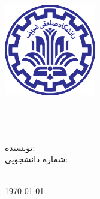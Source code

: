\begin{titlepage}

\center %



\includegraphics[width=0.3\textwidth]{title/logo.png}\\[1cm] 
\vspace{1cm}
\ifdefined\school
\Large \textsc{\school} \\[1.5cm] %
\ifdefined\department
\large \department\\[1.5cm] %
\fi

\makeatletter
\textsc{{ \huge \bfseries \thesistitle}}\\[1.5cm] %
 


\ifdefined\authorid
نویسنده:
\authorname\\ %
شماره دانشجویی:
\authorid\\[2cm] %
\else
\textsc{\authorname}\\[2cm] %
\fi


\textsc{{\large \today}}\\[2cm] %

\vfill

\textsc{\normalsize \degree}

\vfill %

\end{titlepage}